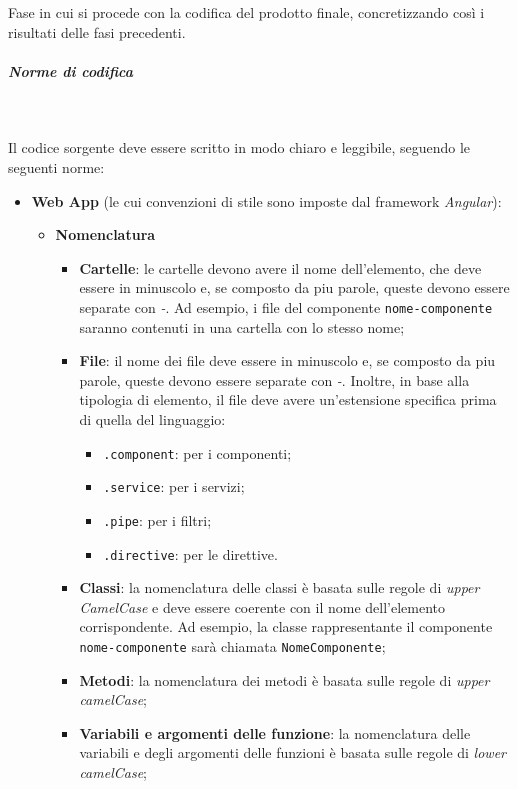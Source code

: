\noindent Fase in cui si procede con la codifica del prodotto finale, concretizzando così i risultati delle fasi precedenti.

\subparagraph{Norme di codifica}~

\noindent Il codice sorgente deve essere scritto in modo chiaro e leggibile, seguendo le seguenti norme:
\begin{itemize}
    \item \textbf{Web App} (le cui convenzioni di stile sono imposte dal framework \textit{Angular}):
    \begin{itemize}
        \item \textbf{Nomenclatura}
        \begin{itemize}
            \item \textbf{Cartelle}: le cartelle devono avere il nome dell'elemento, che deve essere in minuscolo e, se composto da piu parole, queste devono essere separate con \textit{-}.
            Ad esempio, i file del componente \texttt{nome-componente} saranno contenuti in una cartella con lo stesso nome;
            \item \textbf{File}: il nome dei file deve essere in minuscolo e, se composto da piu parole, queste devono essere separate con \textit{-}.
            Inoltre, in base alla tipologia di elemento, il file deve avere un'estensione specifica prima di quella del linguaggio:
            \begin{itemize}
                \item \texttt{.component}: per i componenti;
                \item \texttt{.service}: per i servizi;
                \item \texttt{.pipe}: per i filtri;
                \item \texttt{.directive}: per le direttive.
            \end{itemize}
            \item \textbf{Classi}: la nomenclatura delle classi è basata sulle regole di \textit{upper CamelCase} e deve essere coerente con il nome dell'elemento corrispondente.
            Ad esempio, la classe rappresentante il componente \texttt{nome-componente} sarà chiamata \texttt{NomeComponente};
            \item \textbf{Metodi}: la nomenclatura dei metodi è basata sulle regole di \textit{upper camelCase};
            \item \textbf{Variabili e argomenti delle funzione}: la nomenclatura delle variabili e degli argomenti delle funzioni è basata sulle regole di \textit{lower camelCase};

\end{itemize}
\end{itemize}
\end{itemize}

